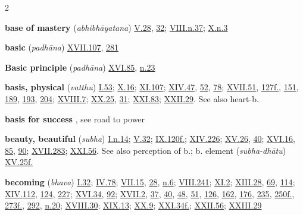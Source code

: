 \begin{multicols}{2}
\begin{vismHanging}
\par\textbf{base of mastery} (\emph{abhibhāyatana}) \hyperlink{V.28}{V.28}{}, \hyperlink{V.32}{32}{}; \hyperlink{VIII.n37}{VIII.n.37}{}; \hyperlink{X.n3}{X.n.3}{}
\par\textbf{basic} (\emph{padhāna}) \hyperlink{XVII.107}{XVII.107}{}, \hyperlink{XVII.281}{281}{}
\par\textbf{Basic principle} (\emph{padhāna}) \hyperlink{XVI.85}{XVI.85}{}, \hyperlink{XVI.n23}{n.23}{}
\par\textbf{basis, physical} (\emph{vatthu}) \hyperlink{I.53}{I.53}{}; \hyperlink{X.16}{X.16}{}; \hyperlink{XI.107}{XI.107}{}; \hyperlink{XIV.47}{XIV.47}{}, \hyperlink{XIV.52}{52}{}, \hyperlink{XIV.78}{78}{}; \hyperlink{XVII.51}{XVII.51}{}, \hyperlink{XVII.127}{127f.}{}, \hyperlink{XVII.151}{151}{}, \hyperlink{XVII.189}{189}{}, \hyperlink{XVII.193}{193}{}, \hyperlink{XVII.204}{204}{}; \hyperlink{XVIII.7}{XVIII.7}{}; \hyperlink{XX.25}{XX.25}{}, \hyperlink{XX.31}{31}{}; \hyperlink{XXI.83}{XXI.83}{}; \hyperlink{XXII.29}{XXII.29}{}. See also heart-b.
\par\textbf{basis for success} , see road to power
\par\textbf{beauty, beautiful} (\emph{subha}) \hyperlink{I.n14}{I.n.14}{}; \hyperlink{V.32}{V.32}{}; \hyperlink{IX.120}{IX.120f.}{}; \hyperlink{XIV.226}{XIV.226}{}; \hyperlink{XV.26}{XV.26}{}, \hyperlink{XV.40}{40}{}; \hyperlink{XVI.16}{XVI.16}{}, \hyperlink{XVI.85}{85}{}, \hyperlink{XVI.90}{90}{}; \hyperlink{XVII.283}{XVII.283}{}; \hyperlink{XXI.56}{XXI.56}{}. See also perception of b.; b. element (\emph{subha-dhātu}) \hyperlink{XV.25}{XV.25f.}{}
\par\textbf{becoming} (\emph{bhava}) \hyperlink{I.32}{I.32}{}; \hyperlink{IV.78}{IV.78}{}; \hyperlink{VII.15}{VII.15}{}, \hyperlink{VII.28}{28}{}, \hyperlink{VII.n6}{n.6}{}; \hyperlink{VIII.241}{VIII.241}{}; \hyperlink{XI.2}{XI.2}{}; \hyperlink{XIII.28}{XIII.28}{}, \hyperlink{XIII.69}{69}{}, \hyperlink{XIII.114}{114}{}; \hyperlink{XIV.112}{XIV.112}{}, \hyperlink{XIV.124}{124}{}, \hyperlink{XIV.227}{227}{}; \hyperlink{XVI.34}{XVI.34}{}, \hyperlink{XVI.92}{92}{}; \hyperlink{XVII.2}{XVII.2}{}, \hyperlink{XVII.37}{37}{}, \hyperlink{XVII.40}{40}{}, \hyperlink{XVII.48}{48}{}, \hyperlink{XVII.51}{51}{}, \hyperlink{XVII.126}{126}{}, \hyperlink{XVII.162}{162}{}, \hyperlink{XVII.176}{176}{}, \hyperlink{XVII.235}{235}{}, \hyperlink{XVII.250}{250f.}{}, \hyperlink{XVII.273}{273f.}{}, \hyperlink{XVII.292}{292}{}, \hyperlink{XVII.n20}{n.20}{}; \hyperlink{XVIII.30}{XVIII.30}{}; \hyperlink{XIX.13}{XIX.13}{}; \hyperlink{XX.9}{XX.9}{}; \hyperlink{XXI.34}{XXI.34f.}{}; \hyperlink{XXII.56}{XXII.56}{}; \hyperlink{XXIII.29}{XXIII.29}{}

\end{vismHanging}
\end{multicols}
